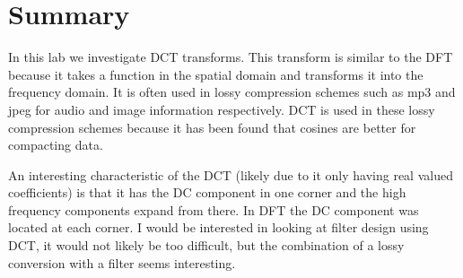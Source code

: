 \section{Summary}

In this lab we investigate DCT transforms. This transform is similar to the DFT
because it takes a function in the spatial domain and transforms it into the
frequency domain. It is often used in lossy compression schemes such as mp3 and
jpeg for audio and image information respectively. DCT is used in these lossy
compression schemes because it has been found that cosines are better for
compacting data.

An interesting characteristic of the DCT (likely due to it only having real
valued coefficients) is that it has the DC component in one corner and the high
frequency components expand from there. In DFT the DC component was located at
each corner. I would be interested in looking at filter design using DCT, it
would not likely be too difficult, but the combination of a lossy conversion
with a filter seems interesting.
